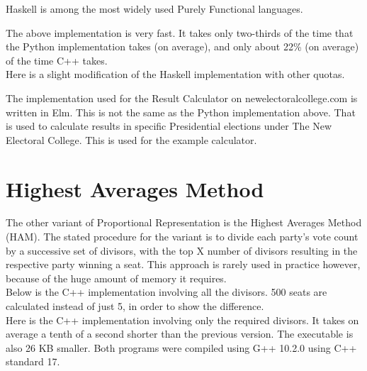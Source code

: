 \documentclass{article}
\begin{document}
    Haskell is among the most widely used Purely Functional languages.

    

    The above implementation is very fast. It takes only two-thirds of the time that the Python implementation takes (on average), and only about 22\% (on average) of the time C++ takes.\\

    Here is a slight modification of the Haskell implementation with other quotas.

    

    The implementation used for the Result Calculator on newelectoralcollege.com is written in Elm. This is not the same as the Python implementation above. That is used to calculate results in specific Presidential elections under The New Electoral College. This is used for the example calculator.

    

    \section{Highest Averages Method}

    The other variant of Proportional Representation is the Highest Averages Method (HAM). The stated procedure for the variant is to divide each party's vote count by a successive set of divisors, with the top X number of divisors resulting in the respective party winning a seat. This approach is rarely used in practice however, because of the huge amount of memory it requires. \\

    Below is the C++ implementation involving all the divisors. 500 seats are calculated instead of just 5, in order to show the difference. \\

    

    Here is the C++ implementation involving only the required divisors. It takes on average a tenth of a second shorter than the previous version. The executable is also 26 KB smaller. Both programs were compiled using G++ 10.2.0 using C++ standard 17. \\

    
\end{document}
